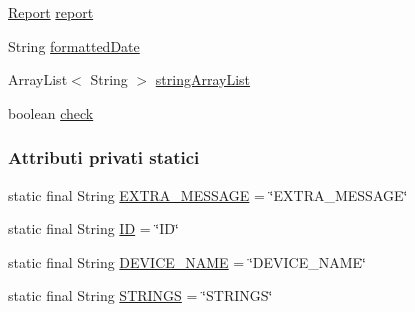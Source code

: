 \begin{DoxyCompactItemize}
\item 
\hyperlink{classit_1_1unibo_1_1torsello_1_1bluetoothpositioning_1_1util_1_1Report}{Report} \hyperlink{classit_1_1unibo_1_1torsello_1_1bluetoothpositioning_1_1fragment_1_1devicesObservers_1_1DeviceChartFragment_a2a22ec815a15de66f0f94b5aa63922a8_a2a22ec815a15de66f0f94b5aa63922a8}{report}
\item 
String \hyperlink{classit_1_1unibo_1_1torsello_1_1bluetoothpositioning_1_1fragment_1_1devicesObservers_1_1DeviceChartFragment_afffb535ee50475bd5f64ac88d8c12875_afffb535ee50475bd5f64ac88d8c12875}{formatted\+Date}
\item 
Array\+List$<$ String $>$ \hyperlink{classit_1_1unibo_1_1torsello_1_1bluetoothpositioning_1_1fragment_1_1devicesObservers_1_1DeviceChartFragment_a7bff8d8b328464c2add8d6664c149cb5_a7bff8d8b328464c2add8d6664c149cb5}{string\+Array\+List}
\item 
boolean \hyperlink{classit_1_1unibo_1_1torsello_1_1bluetoothpositioning_1_1fragment_1_1devicesObservers_1_1DeviceChartFragment_a4b94bdcbcde2d04fc8d3f6b9950520f0_a4b94bdcbcde2d04fc8d3f6b9950520f0}{check}
\end{DoxyCompactItemize}
\subsubsection*{Attributi privati statici}
\begin{DoxyCompactItemize}
\item 
static final String \hyperlink{classit_1_1unibo_1_1torsello_1_1bluetoothpositioning_1_1fragment_1_1devicesObservers_1_1DeviceChartFragment_a07b2f252088c2cf0af46ea39ae83bc09_a07b2f252088c2cf0af46ea39ae83bc09}{E\+X\+T\+R\+A\+\_\+\+M\+E\+S\+S\+A\+GE} = \char`\"{}E\+X\+T\+R\+A\+\_\+\+M\+E\+S\+S\+A\+GE\char`\"{}
\item 
static final String \hyperlink{classit_1_1unibo_1_1torsello_1_1bluetoothpositioning_1_1fragment_1_1devicesObservers_1_1DeviceChartFragment_a00d660ba184cd81eec2512b14ca610c1_a00d660ba184cd81eec2512b14ca610c1}{ID} = \char`\"{}ID\char`\"{}
\item 
static final String \hyperlink{classit_1_1unibo_1_1torsello_1_1bluetoothpositioning_1_1fragment_1_1devicesObservers_1_1DeviceChartFragment_a5f778eb494a70b25d52ea96e85342011_a5f778eb494a70b25d52ea96e85342011}{D\+E\+V\+I\+C\+E\+\_\+\+N\+A\+ME} = \char`\"{}D\+E\+V\+I\+C\+E\+\_\+\+N\+A\+ME\char`\"{}
\item 
static final String \hyperlink{classit_1_1unibo_1_1torsello_1_1bluetoothpositioning_1_1fragment_1_1devicesObservers_1_1DeviceChartFragment_a343835bbfb305e22881397c1b9249b00_a343835bbfb305e22881397c1b9249b00}{S\+T\+R\+I\+N\+GS} = \char`\"{}S\+T\+R\+I\+N\+GS\char`\"{}
\end{DoxyCompactItemize}


